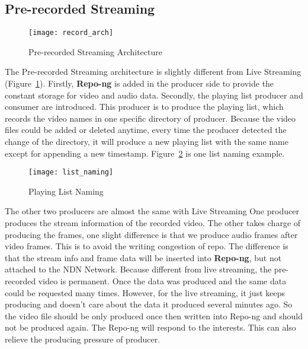 \subsection{Pre-recorded Streaming}
\begin{figure}%
  \centering
  \texttt{[image: record\_arch]}
  \caption{Pre-recorded Streaming Architecture}
  \label{fig:record_arch}
\end{figure}

The Pre-recorded Streaming architecture is slightly different from Live Streaming (Figure~\ref{fig:record_arch}). Firstly, \textbf{Repo-ng} is added in the producer side to provide the constant storage for video and audio data. Secondly, the playing list producer and consumer are introduced. This producer is to produce the playing list, which records the video names in one specific directory of producer. Because the video files could be added or deleted anytime, every time the producer detected the change of the directory, it will produce a new playing list with the same name except for appending a new timestamp. Figure~\ref{fig:list_naming} is one list naming example. 

\begin{figure}%
  \centering
  \texttt{[image: list\_naming]}
  \caption{Playing List Naming}
  \label{fig:list_naming}
\end{figure}

The other two producers are almost the same with Live Streaming  One producer produces the stream information of the recorded video. The other takes charge of producing the frames, one slight difference is that we produce audio frames after video frames. This is to avoid the writing congestion of repo. The difference is that the stream info and frame data will be inserted into \textbf{Repo-ng}, but not attached to the NDN Network. Because different from live streaming, the pre-recorded video is permanent. Once the data was produced and the same data could be requested many times. However, for the live streaming, it just keeps producing and doesn't care about the data it produced several minutes ago. So the video file should be only produced once then written into Repo-ng and should not be produced again. The Repo-ng will respond to the interests. This can also relieve the producing pressure of producer.  

